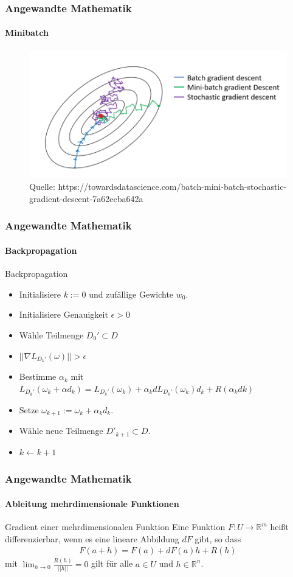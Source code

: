 \documentclass{beamer}
\begin{document}
\begin{frame}
    \frametitle{Angewandte Mathematik}
\framesubtitle{Minibatch}
\begin{figure}[H]
      \centering
    \includegraphics[width=1.0\textwidth]{images/batchgradient}
      \caption{Quelle: https://towardsdatascience.com/batch-mini-batch-stochastic-gradient-descent-7a62ecba642a}
\end{figure}

 \end{frame}
\begin{frame}
    \frametitle{Angewandte Mathematik}
\framesubtitle{Backpropagation}
    \begin{block}{Backpropagation}
\begin{itemize}
\item  Initialisiere $k:=0$ und zufällige Gewichte $w_0$.
\item \pause Initialisiere Genauigkeit $\epsilon > 0$
\item \pause Wähle Teilmenge $D_0' \subset D$
\item \pause   {} {$|| \nabla L_{D_k'}(\omega) || > \epsilon$}  
\item \pause Bestimme $\alpha_k$  mit $ L_{D_k'}(\omega_k + \alpha d_k) =  L_{D_k'}(\omega_k) + \alpha_k d L_{D_k'}(\omega_k)d_k + R( \alpha_k dk)$ 
\item \pause  Setze $\omega_{k+1} := \omega_k  + \alpha_k d_k$. 
\item \pause Wähle neue Teilmenge $D'_{k +1} \subset D$.
\item \pause $k \leftarrow k+1$
\end{itemize}
\end{block}
 \end{frame}



\begin{frame}
    \frametitle{Angewandte Mathematik}
\framesubtitle{Ableitung mehrdimensionale Funktionen }
    \begin{block}{Gradient einer  mehrdimensionalen Funktion}
Eine Funktion $F: U \to \mathbb{R}^m$ heißt differenzierbar, wenn es eine lineare Abbildung $dF$ gibt, so dass 
\begin{align*}
F(a + h) = F(a) + dF(a)h + R(h)
\end{align*}
mit $\lim_{h \to 0} \frac{R(h)}{||h||} = 0$ gilt für alle $a \in U$ und $h \in \mathbb{R}^n$.
\end{block}
 \end{frame}
\end{document}
